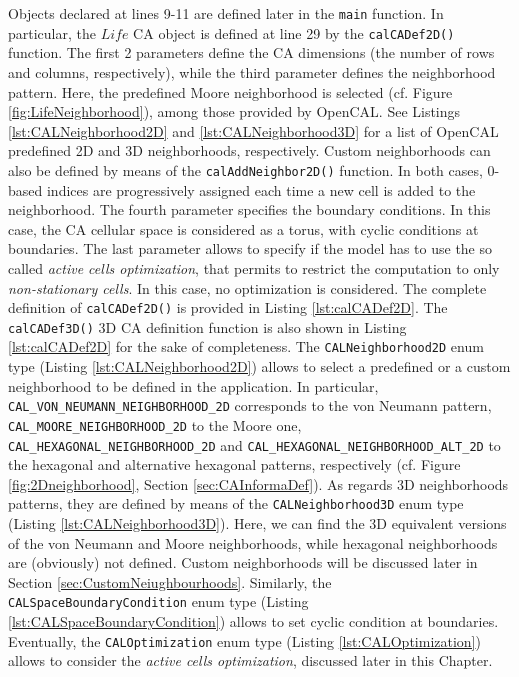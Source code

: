 Objects declared at lines 9-11 are defined later in the \verb'main'
function. In particular, the $Life$ CA object is defined at line 29 by
the \verb'calCADef2D()' function. The first 2 parameters define the CA
dimensions (the number of rows and columns, respectively), while the
third parameter defines the neighborhood pattern. Here, the predefined
Moore neighborhood is selected (cf. Figure
\ref{fig:LifeNeighborhood}), among those provided by OpenCAL. See
Listings \ref{lst:CALNeighborhood2D} and \ref{lst:CALNeighborhood3D}
for a list of OpenCAL predefined 2D and 3D neighborhoods,
respectively. Custom neighborhoods can also be defined by means of the
\verb'calAddNeighbor2D()' function. In both cases, 0-based indices are
progressively assigned each time a new cell is added to the
neighborhood. The fourth parameter specifies the boundary
conditions. In this case, the CA cellular space is considered as a
torus, with cyclic conditions at boundaries. The last parameter allows
to specify if the model has to use the so called \emph{active cells
  optimization}, that permits to restrict the computation to only
\emph{non-stationary cells}. In this case, no optimization is
considered. The complete definition of \verb'calCADef2D()' is provided
in Listing \ref{lst:calCADef2D}. The \verb'calCADef3D()' 3D CA
definition function is also shown in Listing \ref{lst:calCADef2D} for
the sake of completeness. The \verb'CALNeighborhood2D' enum type
(Listing \ref{lst:CALNeighborhood2D}) allows to select a predefined or
a custom neighborhood to be defined in the application. In particular,
\verb'CAL_VON_NEUMANN_NEIGHBORHOOD_2D' corresponds to the von Neumann
pattern, \verb'CAL_MOORE_NEIGHBORHOOD_2D' to the Moore one,
\verb'CAL_HEXAGONAL_NEIGHBORHOOD_2D' and
\verb'CAL_HEXAGONAL_NEIGHBORHOOD_ALT_2D' to the hexagonal and
alternative hexagonal patterns, respectively (cf. Figure
\ref{fig:2Dneighborhood}, Section \ref{sec:CAInformaDef}). As regards
3D neighborhoods patterns, they are defined by means of the
\verb'CALNeighborhood3D' enum type (Listing
\ref{lst:CALNeighborhood3D}). Here, we can find the 3D equivalent
versions of the von Neumann and Moore neighborhoods, while hexagonal
neighborhoods are (obviously) not defined. Custom neighborhoods will
be discussed later in Section
\ref{sec:CustomNeiughbourhoods}. Similarly, the
\verb'CALSpaceBoundaryCondition' enum type (Listing
\ref{lst:CALSpaceBoundaryCondition}) allows to set cyclic condition at
boundaries. Eventually, the \verb'CALOptimization' enum type (Listing
\ref{lst:CALOptimization}) allows to consider the \emph{active cells
  optimization}, discussed later in this Chapter.


